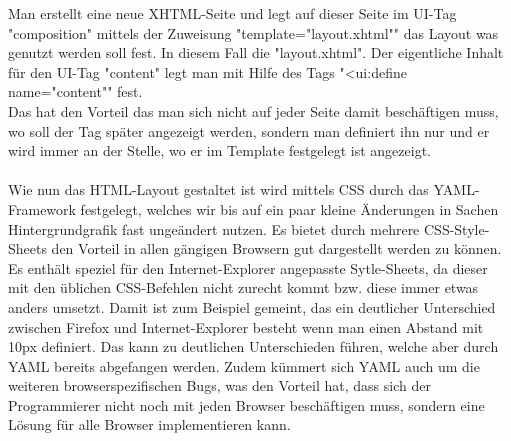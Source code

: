 Man erstellt eine neue XHTML-Seite und legt auf dieser Seite im UI-Tag "composition" mittels der Zuweisung "template="layout.xhtml"" das Layout was genutzt werden soll fest. In diesem Fall die "layout.xhtml". Der eigentliche Inhalt für den UI-Tag "content" legt man mit Hilfe des Tags "<ui:define name="content"" fest. \\
Das hat den Vorteil das man sich nicht auf jeder Seite damit beschäftigen muss, wo soll der Tag später angezeigt werden, sondern man definiert ihn nur und er wird immer an der Stelle, wo er im Template festgelegt ist angezeigt.\\
\\
Wie nun das HTML-Layout gestaltet ist wird mittels CSS durch das YAML-Framework festgelegt, welches wir bis auf ein paar kleine Änderungen in Sachen Hintergrundgrafik fast ungeändert nutzen. Es bietet durch mehrere CSS-Style-Sheets den Vorteil in allen gängigen Browsern gut dargestellt werden zu können. Es enthält speziel für den Internet-Explorer angepasste Sytle-Sheets, da dieser mit den üblichen CSS-Befehlen nicht zurecht kommt bzw. diese immer etwas anders umsetzt. Damit ist zum Beispiel gemeint, das ein deutlicher Unterschied zwischen Firefox und Internet-Explorer besteht wenn man einen Abstand mit 10px definiert. Das kann zu deutlichen Unterschieden führen, welche aber durch YAML bereits abgefangen werden. Zudem kümmert sich YAML auch um die weiteren browserspezifischen Bugs, was den Vorteil hat, dass sich der Programmierer nicht noch mit jeden Browser beschäftigen muss, sondern eine Lösung für alle Browser implementieren kann.




